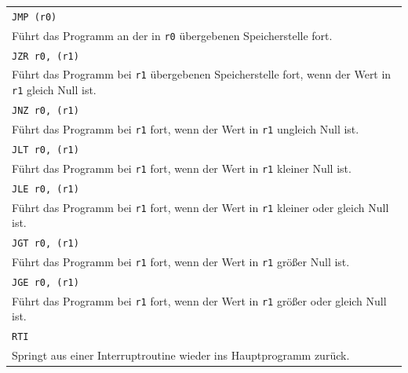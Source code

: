 {\begin{longtable}{|p{\textwidth}|}
        \hline
        \hline

        \hline
        \verb|JMP (r0)| \\
        Führt das Programm an der in \texttt{r0} übergebenen Speicherstelle fort.
        \\

        \hline
        \verb|JZR r0, (r1)| \\
        Führt das Programm bei \texttt{r1} übergebenen Speicherstelle fort,
        wenn der Wert in \texttt{r1} gleich Null ist.
        \\

        \hline
        \verb|JNZ r0, (r1)| \\
        Führt das Programm bei \texttt{r1} fort, wenn der Wert in \texttt{r1}
        ungleich Null ist.
        \\

        \hline
        \verb|JLT r0, (r1)| \\
        Führt das Programm bei \texttt{r1} fort, wenn der Wert in \texttt{r1}
        kleiner Null ist.
        \\

        \hline
        \verb|JLE r0, (r1)| \\
        Führt das Programm bei \texttt{r1} fort, wenn der Wert in \texttt{r1}
        kleiner oder gleich Null ist.
        \\

        \hline
        \verb|JGT r0, (r1)| \\
        Führt das Programm bei \texttt{r1} fort, wenn der Wert in \texttt{r1}
        größer Null ist.
        \\

        \hline
        \verb|JGE r0, (r1)| \\
        Führt das Programm bei \texttt{r1} fort, wenn der Wert in \texttt{r1}
        größer oder gleich Null ist.
        \\

        \hline
        \hline

        \hline
        \verb|RTI| \\
        Springt aus einer Interruptroutine wieder ins Hauptprogramm zurück.
        \\

        \hline
    \end{longtable}
}

%

